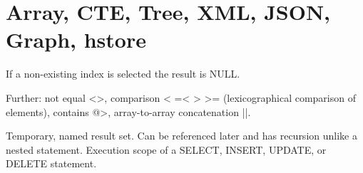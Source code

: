
\section{Array, CTE, Tree, XML, JSON, Graph, hstore}

\begin{breakbox}

\end{breakbox}

\begin{breakbox}
\end{breakbox}

\begin{breakbox}
\end{breakbox}

\begin{breakbox}

If a non-existing index is selected the result is NULL.
\end{breakbox}

\begin{breakbox}
\end{breakbox}

\begin{breakbox}

Further: not equal <>, comparison < =< > >= (lexicographical comparison of elements), contains @>, array-to-array concatenation ||.
\end{breakbox}

\begin{breakbox}

Temporary, named result set. Can be referenced later and has recursion unlike a nested statement. Execution scope of a SELECT, INSERT, UPDATE, or DELETE statement.


\end{breakbox}

